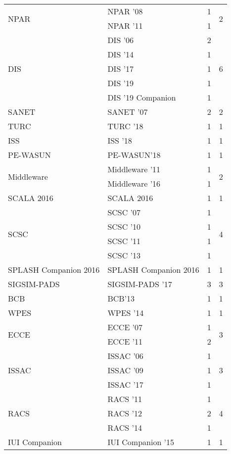 \begin{table*}[t]
\begin{tabular}{llrr}
\multirow{2}{*}{NPAR } & NPAR '08 & 1 & \multirow{2}{*}{2}\\
& NPAR '11 & 1 &\\
\multirow{5}{*}{DIS } & DIS '06 & 2 & \multirow{5}{*}{6}\\
& DIS '14 & 1 &\\
& DIS '17 & 1 &\\
& DIS '19 & 1 &\\
& DIS '19 Companion & 1 &\\
\multirow{1}{*}{SANET } & SANET '07 & 2 & \multirow{1}{*}{2}\\
\multirow{1}{*}{TURC } & TURC '18 & 1 & \multirow{1}{*}{1}\\
\multirow{1}{*}{ISS } & ISS '18 & 1 & \multirow{1}{*}{1}\\
\multirow{1}{*}{PE-WASUN} & PE-WASUN'18 & 1 & \multirow{1}{*}{1}\\
\multirow{2}{*}{Middleware } & Middleware '11 & 1 & \multirow{2}{*}{2}\\
& Middleware '16 & 1 &\\
\multirow{1}{*}{SCALA 2016} & SCALA 2016 & 1 & \multirow{1}{*}{1}\\
\multirow{4}{*}{SCSC } & SCSC '07 & 1 & \multirow{4}{*}{4}\\
& SCSC '10 & 1 &\\
& SCSC '11 & 1 &\\
& SCSC '13 & 1 &\\
\multirow{1}{*}{SPLASH Companion 2016} & SPLASH Companion 2016 & 1 & \multirow{1}{*}{1}\\
\multirow{1}{*}{SIGSIM-PADS } & SIGSIM-PADS '17 & 3 & \multirow{1}{*}{3}\\
\multirow{1}{*}{BCB} & BCB'13 & 1 & \multirow{1}{*}{1}\\
\multirow{1}{*}{WPES } & WPES '14 & 1 & \multirow{1}{*}{1}\\
\multirow{2}{*}{ECCE } & ECCE '07 & 1 & \multirow{2}{*}{3}\\
& ECCE '11 & 2 &\\
\multirow{3}{*}{ISSAC } & ISSAC '06 & 1 & \multirow{3}{*}{3}\\
& ISSAC '09 & 1 &\\
& ISSAC '17 & 1 &\\
\multirow{3}{*}{RACS } & RACS '11 & 1 & \multirow{3}{*}{4}\\
& RACS '12 & 2 &\\
& RACS '14 & 1 &\\
\multirow{1}{*}{IUI Companion } & IUI Companion '15 & 1 & \multirow{1}{*}{1}\\

\end{tabular}
\end{table*}
